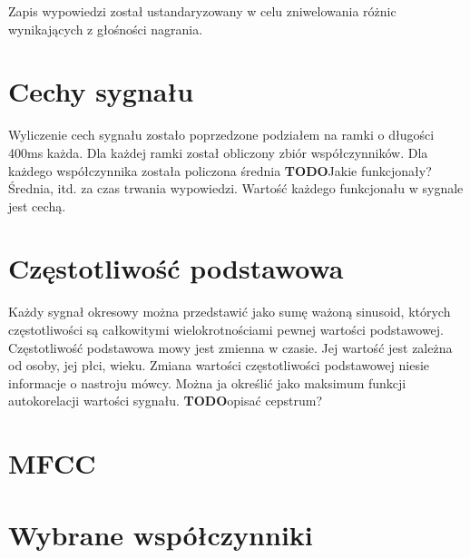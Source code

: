 \documentclass[a4paper,12pt,twoside,openany]{report}
\newcommand{\TODO}{\textbf{TODO}}
\begin{document}
Zapis wypowiedzi został ustandaryzowany w celu zniwelowania różnic wynikających z głośności nagrania.
\section{Cechy sygnału}
Wyliczenie cech sygnału zostało poprzedzone podziałem na ramki o długości 400ms każda. 
Dla każdej ramki został obliczony zbiór współczynników.
Dla każdego współczynnika została policzona średnia \TODO{Jakie funkcjonały? Średnia, itd.}
za  czas trwania wypowiedzi. 
Wartość każdego funkcjonału w sygnale jest cechą.
\section{Częstotliwość podstawowa}
Każdy sygnał okresowy można przedstawić jako sumę ważoną sinusoid, których częstotliwości są całkowitymi wielokrotnościami pewnej wartości podstawowej.
\cite{Nielsena2016}
Częstotliwość podstawowa mowy jest zmienna w czasie. 
Jej wartość jest zależna od osoby, jej płci, wieku.
Zmiana wartości częstotliwości podstawowej niesie informacje o nastroju mówcy.
Można ja określić jako maksimum funkcji autokorelacji wartości sygnału.
\TODO{opisać cepstrum?}
\cite{Boersma1993}

\section{MFCC}



\section{Wybrane współczynniki}
{}

\end{document}
